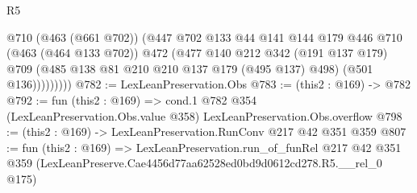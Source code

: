 \begin{lexlean}{R5}
\begin{coremodule}
                @710
                (@463 (@661 @702))
                (@447
                  @702
                  @133
                  @44
                  @141
                  @144
                  @179
                  @446
                  @710
                  (@463 (@464 @133 @702))
                  @472
                  (@477
                    @140
                    @212
                    @342
                    (@191 @137 @179)
                    @709
                    (@485 @138 @81 @210 @210 @137 @179 (@495 @137) @498)
                    (@501 @136)))))))))
@782 := LexLeanPreservation.Obs
@783 := (this2 : @169) -> @782
@792 := fun (this2 : @169) =>
  cond.{1} @782 @354 (LexLeanPreservation.Obs.value @358) LexLeanPreservation.Obs.overflow
@798 := (this2 : @169) -> LexLeanPreservation.RunConv @217 @42 @351 @359
@807 := fun (this2 : @169) =>
  LexLeanPreservation.run_of_funRel
    @217
    @42
    @351
    @359
    (LexLeanPreserve.Cae4456d77aa62528ed0bd9d0612cd278.R5.__rel_0 @175)
\end{coremodule}
\end{lexlean}
